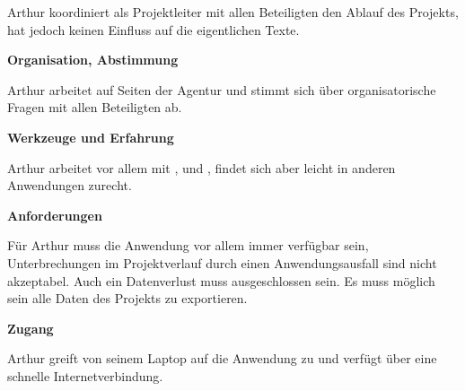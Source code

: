 \begin{multicols}{2}

\begin{center}
\end{center}


Arthur koordiniert als Projektleiter mit allen Beteiligten den Ablauf des Projekts, hat jedoch keinen Einfluss auf die eigentlichen Texte.

\textbf{Organisation, Abstimmung}

Arthur arbeitet auf Seiten der Agentur und stimmt sich über organisatorische Fragen mit allen Beteiligten ab.

\textbf{Werkzeuge und Erfahrung}

Arthur arbeitet vor allem mit ,  und , findet sich aber leicht in anderen Anwendungen zurecht.

\textbf{Anforderungen}

Für Arthur muss die Anwendung vor allem immer verfügbar sein, Unterbrechungen im Projektverlauf durch einen Anwendungsausfall sind nicht akzeptabel. Auch ein Datenverlust muss ausgeschlossen sein. Es muss möglich sein alle Daten des Projekts zu exportieren.

\columnbreak

\textbf{Zugang}

Arthur greift von seinem Laptop auf die Anwendung zu und verfügt über eine schnelle Internetverbindung.


\end{multicols}
